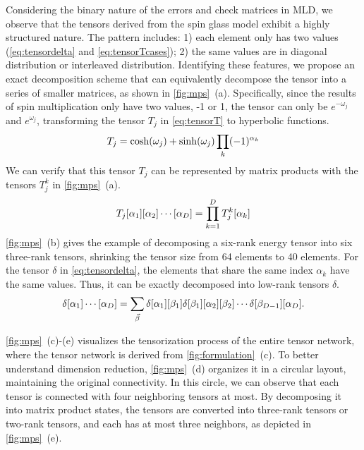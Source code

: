 Considering the binary nature of the errors and check matrices in MLD, we observe that the tensors derived from the spin glass model exhibit a highly structured nature. The pattern includes: 1) each element only has two values (\eqref{eq:tensordelta} and \eqref{eq:tensorTcases}); 2) the same values are in diagonal distribution or interleaved distribution. Identifying these features, we propose an exact decomposition scheme that can equivalently decompose the tensor into a series of smaller matrices, as
shown in \autoref{fig:mps}~(a). 
Specifically, since the results of spin multiplication only have two values, -1 or 1, the tensor can only be $e^{-\omega_j}$ and $e^{\omega_j}$, transforming the tensor $T_j$ in \eqref{eq:tensorT} to hyperbolic functions.
\begin{equation} \small
    T_j = \cosh (\omega_j) + \sinh (\omega_j) \prod_k (-1)^{\alpha_k}
\end{equation}
We can verify that this tensor $T_j$ can be represented by matrix products with the tensors $T_j^k$ in \autoref{fig:mps}~(a).
\begin{equation}\small
    T_j[\alpha_1][\alpha_2]\cdots[\alpha_D] = \prod_{k=1}^{D} T^k_j[\alpha_k]
\end{equation}
\autoref{fig:mps}~(b) gives the example of decomposing a six-rank energy tensor into six three-rank tensors, shrinking the tensor size from 64 elements to 40 elements.
For the tensor $\delta$ in \eqref{eq:tensordelta}, the elements that share the same index $\alpha_k$ have the same values. Thus, it can be exactly decomposed into low-rank tensors $\delta$.
\begin{equation}\small
    \delta[\alpha_1]\cdots[\alpha_D] = \sum_{\vec{\beta}} \delta[\alpha_1][\beta_1] \delta[\beta_1] [\alpha_2] [\beta_2]\cdots \delta[\beta_{D-1}] [\alpha_D].
\end{equation}

\autoref{fig:mps}~(c)-(e) visualizes the tensorization process of the entire tensor network, where the tensor network is derived from \autoref{fig:formulation}~(c). To better understand dimension reduction, \autoref{fig:mps}~(d) organizes it in a circular layout, maintaining the original connectivity. In this circle, we can observe that each tensor is connected with four neighboring tensors at most. By decomposing it into matrix product states, the tensors are converted into three-rank tensors or two-rank tensors, and each has at most three neighbors, as depicted in \autoref{fig:mps}~(e).

